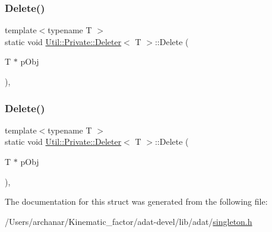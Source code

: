 \mbox{\label{structUtil_1_1Private_1_1Deleter_adcc10f3684fbff2ca9a16827f30994b4}} 
\subsubsection{\texorpdfstring{Delete()}{Delete()}\hspace{0.1cm}{\footnotesize\ttfamily [2/3]}}
{\footnotesize\ttfamily template$<$typename T $>$ \\
static void \mbox{\hyperlink{structUtil_1_1Private_1_1Deleter}{Util\+::\+Private\+::\+Deleter}}$<$ T $>$\+::Delete (\begin{DoxyParamCaption}\item[{T $\ast$}]{p\+Obj }\end{DoxyParamCaption})\hspace{0.3cm}{\ttfamily [inline]}, {\ttfamily [static]}}

\mbox{\label{structUtil_1_1Private_1_1Deleter_adcc10f3684fbff2ca9a16827f30994b4}} 
\subsubsection{\texorpdfstring{Delete()}{Delete()}\hspace{0.1cm}{\footnotesize\ttfamily [3/3]}}
{\footnotesize\ttfamily template$<$typename T $>$ \\
static void \mbox{\hyperlink{structUtil_1_1Private_1_1Deleter}{Util\+::\+Private\+::\+Deleter}}$<$ T $>$\+::Delete (\begin{DoxyParamCaption}\item[{T $\ast$}]{p\+Obj }\end{DoxyParamCaption})\hspace{0.3cm}{\ttfamily [inline]}, {\ttfamily [static]}}



The documentation for this struct was generated from the following file\+:\begin{DoxyCompactItemize}
\item 
/\+Users/archanar/\+Kinematic\+\_\+factor/adat-\/devel/lib/adat/\mbox{\hyperlink{adat-devel_2lib_2adat_2singleton_8h}{singleton.\+h}}\end{DoxyCompactItemize}
